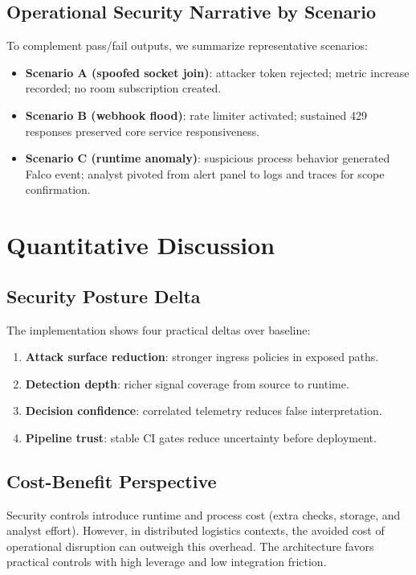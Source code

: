 \documentclass[conference]{IEEEtran}
\begin{document}
\subsection{Operational Security Narrative by Scenario}
To complement pass/fail outputs, we summarize representative scenarios:
\begin{itemize}
\item \textbf{Scenario A (spoofed socket join)}: attacker token rejected; metric increase recorded; no room subscription created.
\item \textbf{Scenario B (webhook flood)}: rate limiter activated; sustained 429 responses preserved core service responsiveness.
\item \textbf{Scenario C (runtime anomaly)}: suspicious process behavior generated Falco event; analyst pivoted from alert panel to logs and traces for scope confirmation.
\end{itemize}

\section{Quantitative Discussion}
\subsection{Security Posture Delta}
The implementation shows four practical deltas over baseline:
\begin{enumerate}
\item \textbf{Attack surface reduction}: stronger ingress policies in exposed paths.
\item \textbf{Detection depth}: richer signal coverage from source to runtime.
\item \textbf{Decision confidence}: correlated telemetry reduces false interpretation.
\item \textbf{Pipeline trust}: stable CI gates reduce uncertainty before deployment.
\end{enumerate}

\subsection{Cost-Benefit Perspective}
Security controls introduce runtime and process cost (extra checks, storage, and analyst effort). However, in distributed logistics contexts, the avoided cost of operational disruption can outweigh this overhead. The architecture favors practical controls with high leverage and low integration friction.
\end{document}
